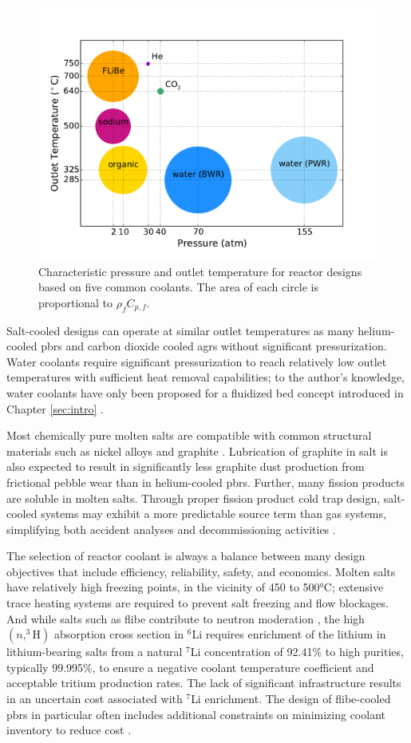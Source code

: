 \begin{figure}[h!]
\centering
\includegraphics[width=0.6\linewidth]{figs/fluid_T_p.pdf}
\caption{Characteristic pressure and outlet temperature for reactor designs based on five common coolants. The area of each circle is proportional to \(\rho_fC_{p,f}\).}
\label{fig:fluid_T_p}
\end{figure}

Salt-cooled designs can operate at similar outlet temperatures as many helium-cooled \glspl{pbr} and carbon dioxide cooled \glspl{agr} without significant pressurization. Water coolants require significant pressurization to reach relatively low outlet temperatures with sufficient heat removal capabilities; to the author's knowledge, water coolants have only been proposed for a fluidized bed concept introduced in Chapter \ref{sec:intro} \cite{sefidvash,sefidvash_1996}.

Most chemically pure molten salts are compatible with common structural materials such as nickel alloys and graphite \cite{fratoni}. Lubrication of graphite in salt is also expected to result in significantly less graphite dust production from frictional pebble wear than in helium-cooled \glspl{pbr}. Further, many fission products are soluble in molten salts. Through proper fission product cold trap design, salt-cooled systems may exhibit a more predictable source term than gas systems, simplifying both accident analyses and decommissioning activities \cite{moormann}.

The selection of reactor coolant is always a balance between many design objectives that include efficiency, reliability, safety, and economics. Molten salts have relatively high freezing points, in the vicinity of 450 to 500\si{\celsius}; extensive trace heating systems are required to prevent salt freezing and flow blockages. And while salts such as \gls{flibe} contribute to neutron moderation \cite{fratoni}, the high \((n,^3\text{H})\) absorption cross section in $^6$Li requires enrichment of the lithium in lithium-bearing salts from a natural $^7$Li concentration of 92.41\% to high purities, typically 99.995\%, to ensure a negative coolant temperature coefficient and acceptable tritium production rates. The lack of significant infrastructure results in an uncertain cost associated with $^7$Li enrichment. The design of \gls{flibe}-cooled \glspl{pbr} in particular often includes additional constraints on minimizing coolant inventory to reduce cost \cite{pbfhr}.

